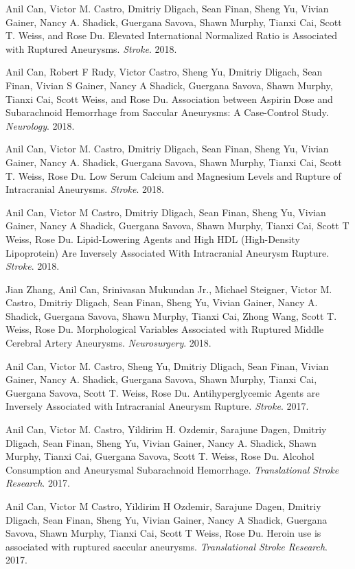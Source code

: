 \documentclass[letterpaper]{article}
\renewenvironment{itemize}{
  \begin{list}{}{
    \setlength{\leftmargin}{1.5em}
  }
}{
  \end{list}
}
\begin{document}
\begin{itemize}
\item Anil Can, Victor M. Castro, Dmitriy Dligach, Sean Finan, Sheng Yu, Vivian Gainer, Nancy A. Shadick, Guergana Savova, Shawn Murphy, Tianxi Cai, Scott T. Weiss, and Rose Du. Elevated International Normalized Ratio is Associated with Ruptured Aneurysms. \emph{Stroke}. 2018.
\item Anil Can, Robert F Rudy, Victor Castro, Sheng Yu, Dmitriy Dligach, Sean Finan, Vivian S Gainer, Nancy A Shadick, Guergana Savova, Shawn Murphy, Tianxi Cai, Scott Weiss, and Rose Du. Association between Aspirin Dose and Subarachnoid Hemorrhage from Saccular Aneurysms: A Case-Control Study. \emph{Neurology}. 2018.
\item Anil Can, Victor M. Castro, Dmitriy Dligach, Sean Finan, Sheng Yu, Vivian Gainer, Nancy A. Shadick, Guergana Savova, Shawn Murphy, Tianxi Cai, Scott T. Weiss, Rose Du. Low Serum Calcium and Magnesium Levels and Rupture of Intracranial Aneurysms. \emph{Stroke}. 2018.
\item Anil Can, Victor M Castro, Dmitriy Dligach, Sean Finan, Sheng Yu, Vivian Gainer, Nancy A Shadick, Guergana Savova, Shawn Murphy, Tianxi Cai, Scott T Weiss, Rose Du. Lipid-Lowering Agents and High HDL (High-Density Lipoprotein) Are Inversely Associated With Intracranial Aneurysm Rupture. \emph{Stroke}. 2018.
\item Jian Zhang, Anil Can, Srinivasan Mukundan Jr., Michael Steigner, Victor M. Castro, Dmitriy Dligach, Sean Finan, Sheng Yu, Vivian Gainer, Nancy A. Shadick, Guergana Savova, Shawn Murphy, Tianxi Cai, Zhong Wang, Scott T. Weiss, Rose Du. Morphological Variables Associated with Ruptured Middle Cerebral Artery Aneurysms. \emph{Neurosurgery}. 2018.
\item Anil Can, Victor M. Castro, Sheng Yu, Dmitriy Dligach, Sean Finan, Vivian Gainer, Nancy A. Shadick, Guergana Savova, Shawn Murphy, Tianxi Cai, Guergana Savova, Scott T. Weiss, Rose Du. Antihyperglycemic Agents are Inversely Associated with Intracranial Aneurysm Rupture. \emph{Stroke}. 2017.
\item Anil Can, Victor M. Castro, Yildirim H. Ozdemir, Sarajune Dagen, Dmitriy Dligach, Sean Finan, Sheng Yu, Vivian Gainer, Nancy A. Shadick, Shawn Murphy, Tianxi Cai, Guergana Savova, Scott T. Weiss, Rose Du. Alcohol Consumption and Aneurysmal Subarachnoid Hemorrhage. \emph{Translational Stroke Research}. 2017.
\item Anil Can, Victor M Castro, Yildirim H Ozdemir, Sarajune Dagen, Dmitriy Dligach, Sean Finan, Sheng Yu, Vivian Gainer, Nancy A Shadick, Guergana Savova, Shawn Murphy, Tianxi Cai, Scott T Weiss, Rose Du. Heroin use is associated with ruptured saccular aneurysms. \emph{Translational Stroke Research}. 2017.

\end{itemize}
\end{document}
